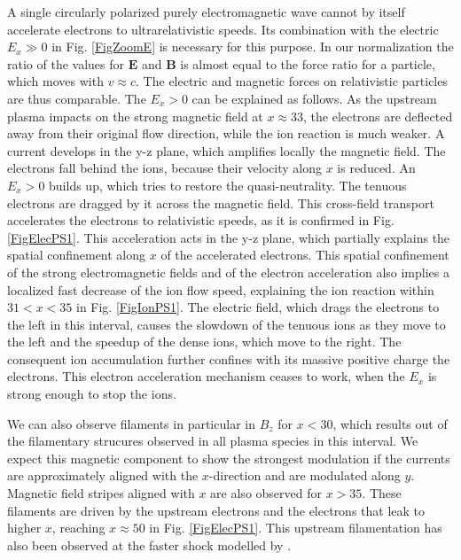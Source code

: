 \documentclass[structabstract]{aa}
\begin{document}
A single circularly polarized purely electromagnetic wave cannot by itself 
accelerate electrons to ultrarelativistic speeds. Its combination with 
the electric $E_x \gg 0$ in Fig. \ref{FigZoomE} is necessary for this 
purpose. In our normalization the ratio of the values for $\mathbf{E}$ and 
$\mathbf{B}$ is almost equal to the force ratio for a particle, which moves 
with $v\approx c$. The electric and magnetic forces on relativistic particles 
are thus comparable. The $E_x>0$ can be explained as follows. As the upstream 
plasma impacts on the strong magnetic field at $x\approx 33$, the electrons 
are deflected away from their original flow direction, while the ion reaction 
is much weaker. A current develops in the y-z plane, which amplifies locally 
the magnetic field. The electrons fall behind the ions, because their velocity 
along $x$ is reduced. An $E_x>0$ builds up, which tries to restore the 
quasi-neutrality. The tenuous electrons are dragged by it across the magnetic 
field. This cross-field transport accelerates the electrons to relativistic 
speeds, as it is confirmed in Fig. \ref{FigElecPS1}. This acceleration 
acts in the y-z plane, which partially explains the spatial confinement along 
$x$ of the accelerated electrons. This spatial confinement of the strong 
electromagnetic fields and of the electron acceleration also implies a 
localized fast decrease of the ion flow speed, explaining the ion reaction 
within $31<x<35$ in Fig. \ref{FigIonPS1}. The electric field, which drags 
the electrons to the left in this interval, causes the slowdown of the tenuous 
ions as they move to the left and the speedup of the dense ions, which move to 
the right. The consequent ion accumulation further confines with its 
massive positive charge the electrons. This electron acceleration mechanism 
ceases to work, when the $E_x$ is strong enough to stop the ions. 

We can also observe filaments in particular in $B_z$ for $x<30$, which results
out of the filamentary strucures observed in all plasma species in this 
interval. We expect this magnetic component to show the strongest modulation
if the currents are approximately aligned with the $x$-direction and are
modulated along $y$. Magnetic field stripes aligned with $x$ are also observed
for $x>35$. These filaments are driven by the upstream electrons and the 
electrons that leak to higher $x$, reaching $x\approx 50$ in Fig. 
\ref{FigElecPS1}. This upstream filamentation has also been observed at the
faster shock modelled by \citet{Martins:2009ly}.
\end{document}
